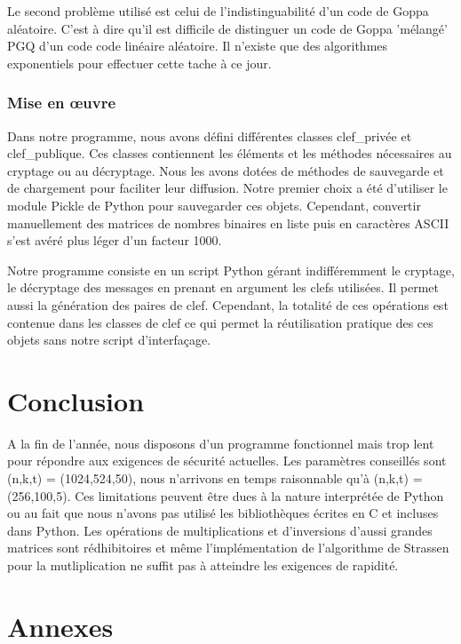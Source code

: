 \documentclass{article}
\begin{document}
			 Le second problème utilisé est celui de l'indistinguabilité d'un code de Goppa aléatoire.
			 C'est à dire qu'il est difficile de distinguer un code de Goppa 'mélangé' PGQ d'un code code linéaire aléatoire.
			 Il n'existe que des algorithmes exponentiels pour effectuer cette tache à ce jour.

		\section*{Mise en œuvre}
			Dans notre programme, nous avons défini différentes classes clef\_privée et clef\_publique.
			Ces classes contiennent les éléments et les méthodes nécessaires au cryptage ou au décryptage.
			Nous les avons dotées de méthodes de sauvegarde et de chargement pour faciliter leur diffusion.
			Notre premier choix a été d'utiliser le module Pickle de Python pour sauvegarder ces objets.
			Cependant, convertir manuellement des matrices de nombres binaires en liste puis en caractères ASCII s'est avéré plus léger d'un facteur 1000.

			Notre programme consiste en un script Python gérant indifféremment le cryptage, le décryptage des messages en prenant en argument les clefs utilisées.
			Il permet aussi la génération des paires de clef.
			Cependant, la totalité de ces opérations est contenue dans les classes de clef ce qui permet la réutilisation pratique des ces objets sans notre script d’interfaçage.

	\part*{Conclusion}

		A la fin de l'année, nous disposons d'un programme fonctionnel mais trop lent pour répondre aux exigences de sécurité actuelles.
		Les paramètres conseillés sont (n,k,t) = (1024,524,50), nous n'arrivons en temps raisonnable qu'à (n,k,t) = (256,100,5).
		Ces limitations peuvent être dues à la nature interprétée de Python ou au fait que nous n'avons pas utilisé les bibliothèques écrites en C et incluses dans Python.
		Les opérations de multiplications et d'inversions d'aussi grandes matrices sont rédhibitoires et même l'implémentation de l'algorithme de Strassen pour la mutliplication ne suffit pas à atteindre les exigences de rapidité.




\newpage
\appendix
\part*{Annexes}
	
\end{document}
